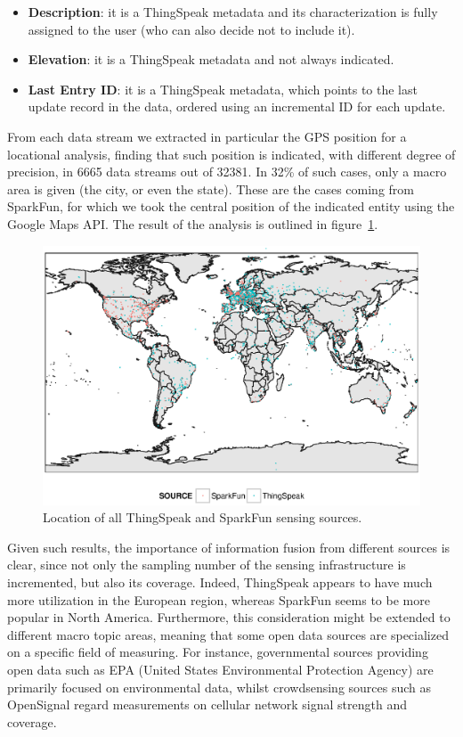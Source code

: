 \begin{itemize}
 \item \textbf{Description}: it is a ThingSpeak metadata and its characterization is fully assigned to the user (who can also decide not to include it).
 \item \textbf{Elevation}: it is a ThingSpeak metadata and not always indicated.
 \item \textbf{Last Entry ID}: it is a ThingSpeak metadata, which points to the last update record in the data, ordered using an incremental ID for each update.
\end{itemize}

From each data stream we extracted in particular the GPS position for a locational analysis, finding that such position is indicated, with different degree of precision, in 6665 data streams out of 32381.
In 32\% of such cases, only a macro area is given (the city, or even the state).
These are the cases coming from SparkFun, for which we took the central position of the indicated entity using the Google Maps API.
The result of the analysis is outlined in figure~\ref{geo}.

\begin{figure}[!t]
\centering
\includegraphics[width=1\textwidth]{img/map.eps} 
\caption{Location of all ThingSpeak and SparkFun sensing sources.}
\label{geo}
\end{figure}

Given such results, the importance of information fusion from different sources is clear, since not only the sampling number of the sensing infrastructure is incremented, but also its coverage.
Indeed, ThingSpeak appears to have much more utilization in the European region, whereas SparkFun seems to be more popular in North America.
Furthermore, this consideration might be extended to different macro topic areas, meaning that some open data sources are specialized on a specific field of measuring.
For instance, governmental sources providing open data such as EPA (United States Environmental Protection Agency) \cite{epa} are primarily focused on environmental data, whilst crowdsensing sources such as OpenSignal \cite{opensignal} regard measurements on cellular network signal strength and coverage.
\\

